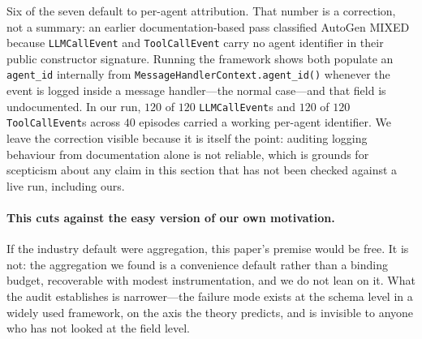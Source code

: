 Six of the seven default to per-agent attribution. That number is a correction,
not a summary: an earlier documentation-based pass classified AutoGen MIXED
because \texttt{LLMCallEvent} and \texttt{ToolCallEvent} carry no agent
identifier in their public constructor signature. Running the framework shows
both populate an \texttt{agent\_id} internally from
\texttt{MessageHandlerContext.agent\_id()} whenever the event is logged inside a
message handler---the normal case---and that field is undocumented. In our run,
$120$ of $120$ \texttt{LLMCallEvent}s and $120$ of $120$
\texttt{ToolCallEvent}s across $40$ episodes carried a working per-agent
identifier. We leave the correction visible because it is itself the point:
auditing logging behaviour from documentation alone is not reliable, which is
grounds for scepticism about any claim in this section that has not been checked
against a live run, including ours.

\paragraph{This cuts against the easy version of our own motivation.} If the
industry default were aggregation, this paper's premise would be free. It is
not: the aggregation we found is a convenience default rather than a binding
budget, recoverable with modest instrumentation, and we do not lean on it. What
the audit establishes is narrower---the failure mode exists at the schema level
in a widely used framework, on the axis the theory predicts, and is invisible to
anyone who has not looked at the field level.
